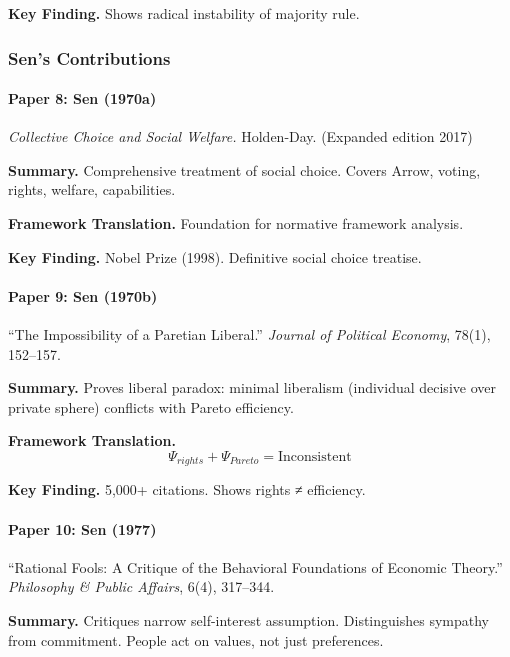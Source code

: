 \textbf{Key Finding.}
Shows radical instability of majority rule.

\subsubsection{Sen's Contributions}

\paragraph{Paper 8: Sen (1970a)}

\textit{Collective Choice and Social Welfare.}
Holden-Day. (Expanded edition 2017)

\textbf{Summary.}
Comprehensive treatment of social choice. Covers Arrow, voting, 
rights, welfare, capabilities.

\textbf{Framework Translation.}
Foundation for normative framework analysis.

\textbf{Key Finding.}
Nobel Prize (1998). Definitive social choice treatise.

\paragraph{Paper 9: Sen (1970b)}

``The Impossibility of a Paretian Liberal.''
\textit{Journal of Political Economy}, 78(1), 152--157.

\textbf{Summary.}
Proves liberal paradox: minimal liberalism (individual decisive over 
private sphere) conflicts with Pareto efficiency.

\textbf{Framework Translation.}
\begin{equation}
\Psi_{rights} + \Psi_{Pareto} = \text{Inconsistent}
\end{equation}

\textbf{Key Finding.}
5,000+ citations. Shows rights ≠ efficiency.

\paragraph{Paper 10: Sen (1977)}

``Rational Fools: A Critique of the Behavioral Foundations of Economic Theory.''
\textit{Philosophy \& Public Affairs}, 6(4), 317--344.

\textbf{Summary.}
Critiques narrow self-interest assumption. Distinguishes sympathy from 
commitment. People act on values, not just preferences.

